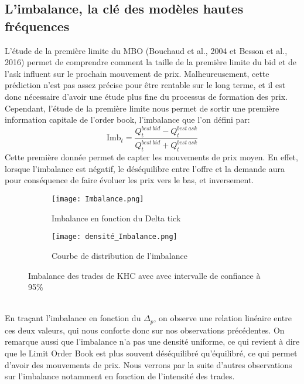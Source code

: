 \documentclass[12pt,a4paper]{article}
\theoremstyle{definition}
\theoremstyle{remark}
\begin{document}
\subsection{L'imbalance, la clé des modèles hautes fréquences}

L'étude de la première limite du MBO (Bouchaud et al., 2004 et Besson et al., 2016) permet de comprendre comment la taille de la première limite du bid et de l'ask influent sur le prochain mouvement de prix. Malheureusement, cette prédiction n'est pas assez précise pour être rentable sur le long terme, et il est donc nécessaire d'avoir une étude plus fine du processus de formation des prix. Cependant, l'étude de la première limite nous permet de sortir une première information capitale de l'order book, l'imbalance que l'on défini par:
$$\text{Imb}_t = \frac{Q^{best\ bid}_t-Q^{best\ ask}_t}{Q^{best\ bid}_t+Q^{best\ ask}_t}$$
Cette première donnée permet de capter les mouvements de prix moyen. En effet, lorsque l'imbalance est négatif, le déséquilibre entre l'offre et la demande aura pour conséquence de faire évoluer les prix vers le bas, et inversement. 
\begin{figure}[h!]
    \centering
    \begin{subfigure}[b]{0.48\textwidth}
        \centering
        \texttt{[image: Imbalance.png]}
        \caption{Imbalance en fonction du Delta tick}
        \label{fig:imbalance}
    \end{subfigure}
    \hfill
    \begin{subfigure}[b]{0.48\textwidth}
        \centering
        \texttt{[image: densité\_Imbalance.png]}
        \caption{Courbe de distribution de l'imbalance}
        \label{fig:densite_imbalance}
    \end{subfigure}
    \caption{Imbalance des trades de KHC avec avec intervalle de confiance à 95\%}
    \label{fig:comparison}
\end{figure}
\\
En traçant l'imbalance en fonction du $\Delta_p$, on observe une relation linéaire entre ces deux valeurs, qui nous conforte donc sur nos observations précédentes. On remarque aussi que l'imbalance n'a pas une densité uniforme, ce qui revient à dire que le Limit Order Book est plus souvent déséquilibré qu'équilibré, ce qui permet d'avoir des mouvements de prix. Nous verrons par la suite d'autres observations sur l'imbalance notamment en fonction de l'intensité des trades.
\\
\end{document}
